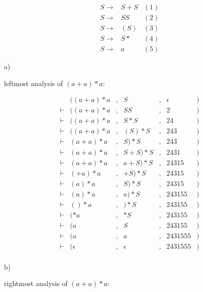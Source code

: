 
\begin{equation*}
  \begin{aligned}
  S \rightarrow & S + S & (1) \\
  S \rightarrow & SS & (2) \\
  S \rightarrow & (S) & (3) \\
  S \rightarrow & S* & (4) \\
  S \rightarrow & a & (5)
\end{aligned}
\end{equation*}

a)

leftmost analysis of $(a + a)*a$:

\begin{equation*}
  \begin{aligned}
          & ((a + a)*a&, &S&, &\epsilon &) \\
 \vdash   & ((a + a)*a&,  &SS&, &2 &) \\
 \vdash   & ((a + a)*a&,  & S*S&, &24&) \\
 \vdash   & ((a + a)*a&,  & (S)*S&, &243&) \\
 \vdash   & (a + a)*a&,  & S)*S&, &243&) \\
 \vdash   & (a + a)*a&,  & S + S)*S&, &2431&) \\
 \vdash   & (a + a)*a&,  & a + S)*S&, &24315&) \\
 \vdash   & (+ a)*a&,  & + S)*S&, &24315&) \\
 \vdash   & (a)*a&,  & S)*S&, &24315&) \\
 \vdash   & (a)*a&,  & a)*S&, &243155&) \\
 \vdash   & ()*a&,  & )*S&, &243155&) \\
 \vdash   & (*a&,  & *S&, &243155&) \\
 \vdash   & (a&,  & S&, &243155&) \\
 \vdash   & (a&,  & a&, &2431555&) \\
 \vdash   & (\epsilon&,  & \epsilon&, &2431555&) \\
\end{aligned}
\end{equation*}

b)

rightmost analysis of $(a + a)*a$:

